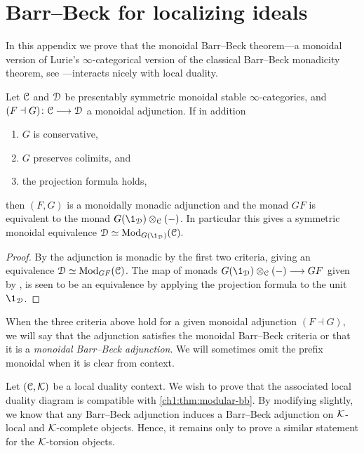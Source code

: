 

\section{Barr--Beck for localizing ideals}
\label{ch1:app:barr-beck}

In this appendix we prove that the monoidal Barr--Beck theorem---a monoidal version of Lurie's $\infty$-categorical version of the classical Barr--Beck monadicity theorem, see \cite[Section 4.7]{Lurie_HA}---interacts nicely with local duality.

\begin{theorem}
    \label{ch1:thm:modular-bb}
    Let $\EuScript{C}$ and $\EuScript{D}$ be presentably symmetric monoidal stable $\infty$-categories, and $(F\dashv G)\colon \EuScript{C}\longrightarrow \EuScript{D}$ a monoidal adjunction. If in addition 
    \begin{enumerate}
        \item $G$ is conservative, 
        \item $G$ preserves colimits, and
        \item the projection formula holds,
    \end{enumerate}
    then $(F,G)$ is a monoidally monadic adjunction and the monad $GF$ is equivalent to the monad $G(\1_\D)\otimes_\C (-)$. In particular this gives a symmetric monoidal equivalence $\D\simeq \Mod_{G(\1_\D)}(\C).$
\end{theorem}
\begin{proof}
    By \cite[4.7.3.5]{Lurie_HA} the adjunction is monadic by the first two criteria, giving an equivalence $\EuScript{D}\simeq \mathrm{Mod}_{GF}(\EuScript{C})$. The map of monads $G(\1_\D)\otimes_\C (-)\to GF$ given by \cite[3.6]{elmanto-kolderup_2020}, is seen to be an equivalence by applying the projection formula to the unit $\1_\D$. 
\end{proof}

\begin{definition}
    When the three criteria above hold for a given monoidal adjunction $(F\dashv G)$, we will say that the adjunction satisfies the monoidal Barr--Beck criteria or that it is a \emph{monoidal Barr--Beck adjunction}. We will sometimes omit the prefix monoidal when it is clear from context. 
\end{definition}

Let $(\EuScript{C}, \mathcal{K})$ be a local duality context. We wish to prove that the associated local duality diagram is compatible with \cref{ch1:thm:modular-bb}. By modifying \cite[3.7]{behrens-shaw_2020} slightly, we know that any Barr--Beck adjunction induces a Barr--Beck adjunction on $\mathcal{K}$-local and $\mathcal{K}$-complete objects. Hence, it remains only to prove a similar statement for the $\mathcal{K}$-torsion objects. 

